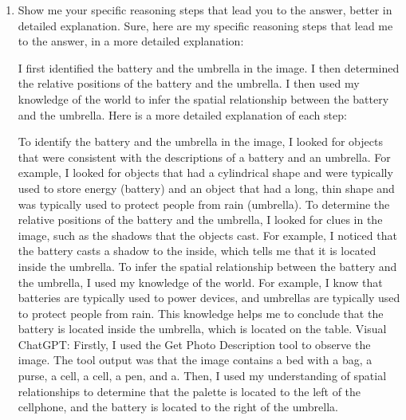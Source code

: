 \begin{enumerate}
    Here are some additional details about the spatial relationship between the battery and the umbrella:
    
    The battery is a cylindrical object that is used to store energy.
    The umbrella is a handheld device that is used to protect people from rain.
    The battery is located inside the umbrella, meaning that it is enclosed by the umbrella.
    The umbrella is located on the floor, meaning that it is not touching any walls.
    \subitem Visual ChatGPT: The battery is located to the right of the umbrella.
    \item Show me your specific reasoning steps that lead you to the answer, better in detailed explanation.
    \subitem 
    Sure, here are my specific reasoning steps that lead me to the answer, in a more detailed explanation:
    
    I first identified the battery and the umbrella in the image.
    I then determined the relative positions of the battery and the umbrella.
    I then used my knowledge of the world to infer the spatial relationship between the battery and the umbrella.
    Here is a more detailed explanation of each step:
    
    To identify the battery and the umbrella in the image, I looked for objects that were consistent with the descriptions of a battery and an umbrella. For example, I looked for objects that had a cylindrical shape and were typically used to store energy (battery) and an object that had a long, thin shape and was typically used to protect people from rain (umbrella).
    To determine the relative positions of the battery and the umbrella, I looked for clues in the image, such as the shadows that the objects cast. For example, I noticed that the battery casts a shadow to the inside, which tells me that it is located inside the umbrella.
    To infer the spatial relationship between the battery and the umbrella, I used my knowledge of the world. For example, I know that batteries are typically used to power devices, and umbrellas are typically used to protect people from rain. This knowledge helps me to conclude that the battery is located inside the umbrella, which is located on the table.
    \subitem Visual ChatGPT: Firstly, I used the Get Photo Description tool to observe the image. The tool output was that the image contains a bed with a bag, a purse, a cell, a cell, a pen, and a. Then, I used my understanding of spatial relationships to determine that the palette is located to the left of the cellphone, and the battery is located to the right of the umbrella.
\end{enumerate}
